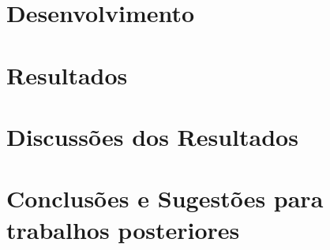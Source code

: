 \documentclass[tg]{ita}    %
\begin{document}
\chapter{Desenvolvimento}


\chapter{Resultados}


\chapter{Discussões dos Resultados}


\chapter{Conclusões e Sugestões para trabalhos posteriores}


% 

% 

% 



% 

% 

\end{document}
